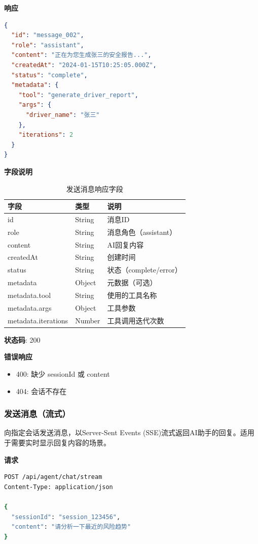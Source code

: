 \documentclass[12pt,a4paper]{article}
\begin{document}
\textbf{响应}

\begin{lstlisting}[language=json]
{
  "id": "message_002",
  "role": "assistant",
  "content": "正在为您生成张三的安全报告...",
  "createdAt": "2024-01-15T10:25:05.000Z",
  "status": "complete",
  "metadata": {
    "tool": "generate_driver_report",
    "args": {
      "driver_name": "张三"
    },
    "iterations": 2
  }
}
\end{lstlisting}

\textbf{字段说明}

\begin{table}[h]
  \centering
  \begin{tabular}{lll}
    \toprule
    字段 & 类型 & 说明 \\
    \midrule
    id & String & 消息ID \\
    role & String & 消息角色（assistant） \\
    content & String & AI回复内容 \\
    createdAt & String & 创建时间 \\
    status & String & 状态（complete/error） \\
    metadata & Object & 元数据（可选） \\
    metadata.tool & String & 使用的工具名称 \\
    metadata.args & Object & 工具参数 \\
    metadata.iterations & Number & 工具调用迭代次数 \\
    \bottomrule
  \end{tabular}
  \caption{发送消息响应字段}
\end{table}

\textbf{状态码}: 200

\textbf{错误响应}

\begin{itemize}
  \item 400: 缺少 sessionId 或 content
  \item 404: 会话不存在
\end{itemize}

\subsubsection{发送消息（流式）}

向指定会话发送消息，以Server-Sent Events (SSE)流式返回AI助手的回复。适用于需要实时显示回复内容的场景。

\textbf{请求}

\begin{lstlisting}[language=bash]
POST /api/agent/chat/stream
Content-Type: application/json

{
  "sessionId": "session_123456",
  "content": "请分析一下最近的风险趋势"
}
\end{lstlisting}
\end{document}
